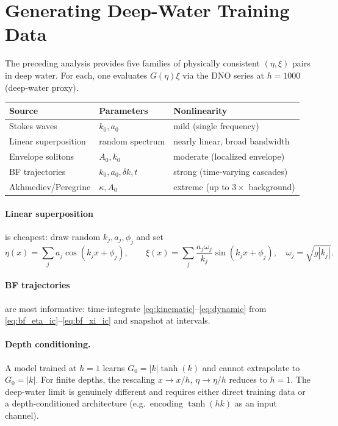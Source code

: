 \documentclass[11pt]{article}
\begin{document}
\section{Generating Deep-Water Training Data}
\label{sec:datagen}

The preceding analysis provides five families of physically consistent
$(\eta, \xi)$ pairs in deep water.
For each, one evaluates $G(\eta)\xi$ via the DNO series at $h = 1000$
(deep-water proxy).

\begin{center}
\begin{tabular}{@{}llp{5cm}@{}}
\toprule
\textbf{Source} & \textbf{Parameters} & \textbf{Nonlinearity} \\
\midrule
Stokes waves & $k_0, a_0$ & mild (single frequency) \\
Linear superposition & random spectrum & nearly linear, broad bandwidth \\
Envelope solitons & $A_0, k_0$ & moderate (localized envelope) \\
BF trajectories & $k_0, a_0, \delta k, t$ & strong (time-varying cascades) \\
Akhmediev/Peregrine & $\kappa, A_0$ & extreme (up to $3\times$ background) \\
\bottomrule
\end{tabular}
\end{center}

\paragraph{Linear superposition} is cheapest:
draw random $k_j, a_j, \phi_j$ and set
\[
\eta(x) = \textstyle\sum_j a_j\cos(k_j x + \phi_j), \qquad
\xi(x) = \textstyle\sum_j \frac{a_j\omega_j}{k_j}\sin(k_j x + \phi_j),
\quad \omega_j = \sqrt{g|k_j|}.
\]

\paragraph{BF trajectories} are most informative:
time-integrate \eqref{eq:kinematic}--\eqref{eq:dynamic} from
\eqref{eq:bf_eta_ic}--\eqref{eq:bf_xi_ic} and snapshot at intervals.

\paragraph{Depth conditioning.}
A model trained at $h = 1$ learns $G_0 = |k|\tanh(k)$ and cannot
extrapolate to $G_0 = |k|$.
For finite depths, the rescaling $x \to x/h$, $\eta \to \eta/h$
reduces to $h = 1$.
The deep-water limit is genuinely different and requires either direct
training data or a depth-conditioned architecture (e.g.\ encoding
$\tanh(hk)$ as an input channel).
\end{document}
